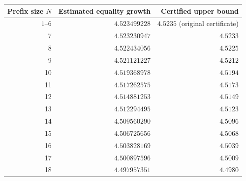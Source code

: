 \begin{tabular}{@{}rrr@{}}
\toprule
Prefix size $N$ & Estimated equality growth & Certified upper bound\\
\midrule
$1$--$6$ & $4.523499228$ & $4.5235$ (original certificate)\\
7 & $4.523230947$ & $4.5233$\\
8 & $4.522434056$ & $4.5225$\\
9 & $4.521121227$ & $4.5212$\\
10 & $4.519368978$ & $4.5194$\\
11 & $4.517262575$ & $4.5173$\\
12 & $4.514881253$ & $4.5149$\\
13 & $4.512294495$ & $4.5123$\\
14 & $4.509560290$ & $4.5096$\\
15 & $4.506725656$ & $4.5068$\\
16 & $4.503828169$ & $4.5039$\\
17 & $4.500897596$ & $4.5009$\\
18 & $4.497957351$ & $4.4980$\\
\bottomrule
\end{tabular}
